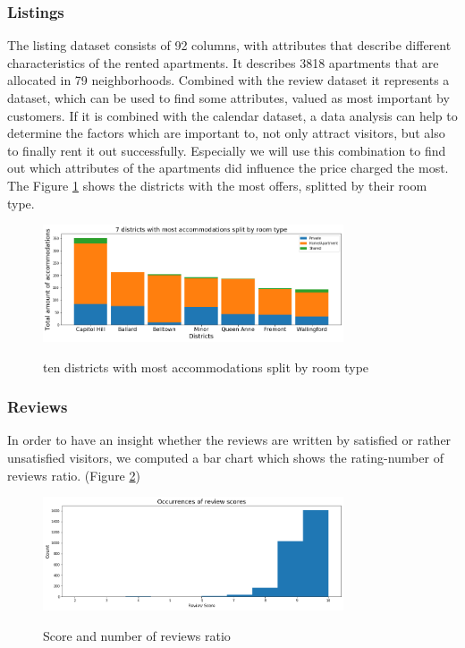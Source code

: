 \subsubsection{Listings}  The listing dataset consists of 92 columns, with attributes that describe different characteristics of the rented apartments. It describes 3818 apartments that are allocated in 79 neighborhoods. Combined with the review dataset it represents a dataset, which can be used to find some attributes, valued as most important by customers. If it is combined with the calendar dataset, a data analysis can help to determine the factors which are important to, not only attract visitors, but also to finally rent it out successfully. Especially we will use this combination to find out which attributes of the apartments did influence the price charged the most. The Figure \ref{districts_room_types} shows the districts with the most offers, splitted by their room type.
%
\begin{figure}
  \begin{center}
  \includegraphics[width=3.5in]{photo/4_most_acc_split_by_roomtype.png}\\
  \caption{ten districts with most accommodations split by room type}\label{districts_room_types}
  \end{center}
\end{figure}
\subsubsection{Reviews}
%
In order to have an insight whether the reviews are written by satisfied or rather unsatisfied visitors, we computed a bar chart which shows the rating-number of reviews ratio. (Figure \ref{score_reviews_ratio})
%
\begin{figure}
  \begin{center}
  \includegraphics[width=3.5in]{photo/2_1_occurences_of_review_scores.png}\\
  \caption{Score and number of reviews ratio}\label{score_reviews_ratio}
  \end{center}
\end{figure}
%

